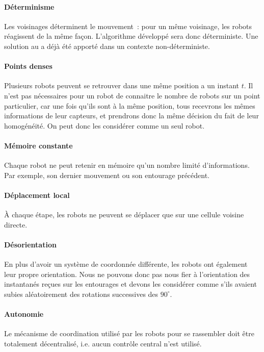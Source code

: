 \paragraph{Déterminisme} Les voisinages déterminent le mouvement~: pour un même
voisinage, les robots réagissent de la même façon. L'algorithme développé sera
donc déterministe. Une solution au \GatheringProblem a déjà été apporté dans
un contexte non-déterministe.

\paragraph{Points denses} Plusieurs robots peuvent se retrouver dans une même
position a un instant $t$. Il n'est pas nécessaires pour un robot de connaitre
le nombre de robots sur un point particulier, car une fois qu'ils sont à la
même position, tous recevrons les mêmes informations de leur capteurs, et
prendrons donc la même décision du fait de leur homogénéité. On peut donc les
considérer comme un seul robot.

\paragraph{Mémoire constante} Chaque robot ne peut retenir en mémoire qu'un
nombre limité d'informations. Par exemple, son dernier mouvement ou son
entourage précédent.

\paragraph{Déplacement local} \`A chaque étape, les robots ne peuvent se
déplacer que sur une cellule voisine directe.

\paragraph{Désorientation} En plus d'avoir un système de coordonnée différente,
les robots ont également leur propre orientation. Nous ne pouvons donc pas nous
fier à l'orientation des instantanés reçues sur les entourages et devons les
considérer comme s'ils avaient subies aléatoirement des rotations successives
des $90^{\circ}$.

\paragraph{Autonomie} Le mécanisme de coordination utilisé par les robots pour
se rassembler doit être totalement décentralisé, i.e. aucun contrôle central
n'est utilisé.

